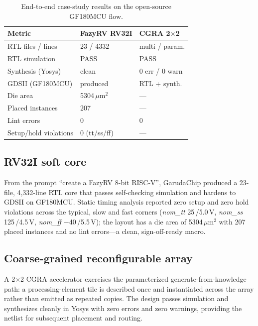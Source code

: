 \documentclass[conference]{IEEEtran}
\begin{document}
\begin{table}[t]
\caption{End-to-end case-study results on the open-source GF180MCU flow.}
\label{tab:results}
\centering
\renewcommand{\arraystretch}{1.15}
\begin{tabular}{lll}
\toprule
\textbf{Metric} & \textbf{FazyRV RV32I} & \textbf{CGRA 2$\times$2} \\
\midrule
RTL files / lines      & 23 / 4332        & multi / param. \\
RTL simulation         & PASS             & PASS \\
Synthesis (Yosys)      & clean            & 0 err / 0 warn \\
GDSII (GF180MCU)       & produced         & RTL + synth. \\
Die area               & 5304\,$\mu$m$^2$ & --- \\
Placed instances       & 207              & --- \\
Lint errors            & 0                & 0 \\
Setup/hold violations  & 0 (tt/ss/ff)     & --- \\
\bottomrule
\end{tabular}
\end{table}

\subsection{RV32I soft core}
From the prompt ``create a FazyRV 8-bit RISC-V'', GarudaChip produced a 23-file,
4{,}332-line RTL core that passes self-checking simulation and hardens to GDSII
on GF180MCU. Static timing analysis reported zero setup and zero hold violations
across the typical, slow and fast corners (\textit{nom\_tt}
25\,\textcelsius/5.0\,V, \textit{nom\_ss} 125\,\textcelsius/4.5\,V,
\textit{nom\_ff} $-$40\,\textcelsius/5.5\,V); the layout has a die area of
5304\,$\mu$m$^2$ with 207 placed instances and no lint errors---a clean,
sign-off-ready macro.

\subsection{Coarse-grained reconfigurable array}
A 2$\times$2 CGRA accelerator exercises the parameterized
generate-from-knowledge path: a processing-element tile is described once and
instantiated across the array rather than emitted as repeated copies. The design
passes simulation and synthesizes cleanly in Yosys with zero errors and zero
warnings, providing the netlist for subsequent placement and routing.
\end{document}
